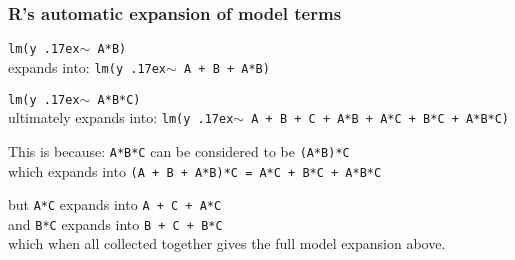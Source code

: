 \documentclass[handout,11pt,aspectratio=169,mathserif]{beamer}
\begin{document}
\begin{frame}\frametitle{R's automatic expansion of model terms}
	\texttt{lm(y {\raise.17ex\hbox{$\scriptstyle\mathtt{\sim}$}} A*B)}\\
		\qquad expands into: {\color{blue}\texttt{lm(y {\raise.17ex\hbox{$\scriptstyle\mathtt{\sim}$}} A + B + A*B)}}
		
	\vspace{24pt}
	\texttt{lm(y {\raise.17ex\hbox{$\scriptstyle\mathtt{\sim}$}} A*B*C)}\\
		\qquad ultimately expands into: {\color{blue}\texttt{lm(y {\raise.17ex\hbox{$\scriptstyle\mathtt{\sim}$}} A + B + C + A*B + A*C + B*C + A*B*C)}}
		
		\vspace{12pt}
		\qquad 
		This is because: \texttt{A*B*C} can be considered to be \texttt{(A*B)*C} \\
		\qquad which expands into \texttt{(A + B + A*B)*C = A*C + B*C + A*B*C}
		
		\vspace{6pt}
		\qquad  but \texttt{A*C} expands into \texttt{A + C + A*C}\\
		\qquad  and \texttt{B*C} expands into \texttt{B + C + B*C} \\
		\qquad which when all collected together gives the full model expansion above.
\end{frame}
\end{document}
